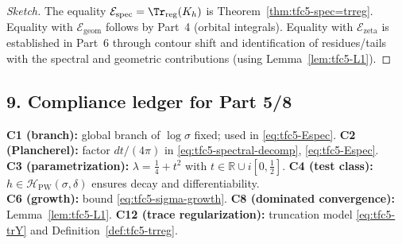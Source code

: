\begin{proof}[Sketch]\relax\hspace{0pt}
The equality $\mathcal{E}_{\mathrm{spec}}=\Tr_{\mathrm{reg}}(K_h)$ is Theorem~\ref{thm:tfc5-spec=trreg}. \relax\hspace{0pt}
Equality with $\mathcal{E}_{\mathrm{geom}}$ follows by Part~4 (orbital integrals). \relax\hspace{0pt}
Equality with $\mathcal{E}_{\mathrm{zeta}}$ is established in Part~6 through contour shift and identification of residues/tails with the spectral and geometric contributions (using Lemma~\ref{lem:tfc5-L1}). \relax\hspace{0pt}
\end{proof}

\subsection*{9. Compliance ledger for Part 5/8}\relax\hspace{0pt}
\label{subsec:tfc5-compliance} %

\noindent
\textbf{C1 (branch):} global branch of $\log\sigma$ fixed; used in \eqref{eq:tfc5-Espec}. \quad
\textbf{C2 (Plancherel):} factor $dt/(4\pi)$ in \eqref{eq:tfc5-spectral-decomp}, \eqref{eq:tfc5-Espec}. \\
\textbf{C3 (parametrization):} $\lambda=\tfrac14+t^2$ with $t\in\mathbb{R}\cup i[0,\tfrac12]$. \quad
\textbf{C4 (test class):} $h\in\mathcal{H}_{\mathrm{PW}}(\sigma,\delta)$ ensures decay and differentiability. \\
\textbf{C6 (growth):} bound \eqref{eq:tfc5-sigma-growth}. \quad
\textbf{C8 (dominated convergence):} Lemma~\ref{lem:tfc5-L1}. \quad
\textbf{C12 (trace regularization):} truncation model \eqref{eq:tfc5-trY} and Definition~\ref{def:tfc5-trreg}. \relax\hspace{0pt}


